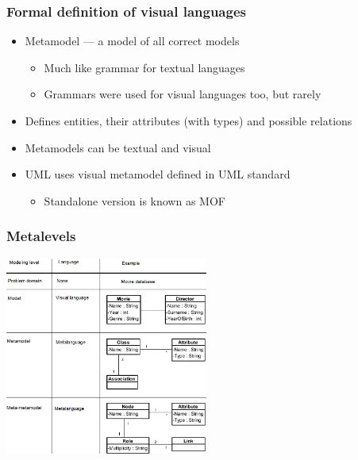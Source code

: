 \documentclass{slides-style}
\begin{document}
    \begin{frame}
        \frametitle{Formal definition of visual languages}
        \begin{itemize}
            \item Metamodel --- a model of all correct models
            \begin{itemize}
                \item Much like grammar for textual languages
                \item Grammars were used for visual languages too, but rarely
            \end{itemize}
            \item Defines entities, their attributes (with types) and possible relations
            \item Metamodels can be textual and visual
            \item UML uses visual metamodel defined in UML standard
            \begin{itemize}
                \item Standalone version is known as MOF
            \end{itemize}
        \end{itemize}
    \end{frame}

    \begin{frame}
        \frametitle{Metalevels}
        \begin{center}
            \includegraphics[width=0.5\textwidth]{metalevels-en.png}
        \end{center}
    \end{frame}
\end{document}
